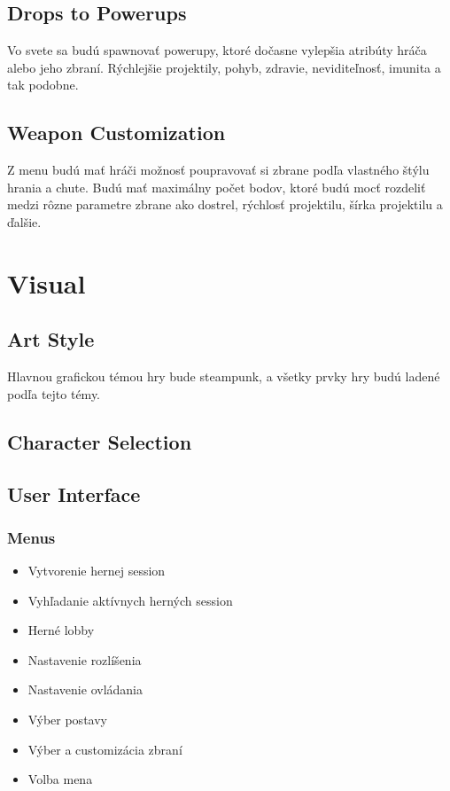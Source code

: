 \documentclass[a4paper]{report}
\begin{document}
\section{Drops to Powerups}
Vo svete sa budú spawnovať powerupy, ktoré dočasne vylepšia atribúty hráča alebo jeho zbraní. Rýchlejšie projektily, pohyb, zdravie, neviditeľnosť, imunita a tak podobne.

\section{Weapon Customization}
Z menu budú mať hráči možnosť poupravovať si zbrane podľa vlastného štýlu hrania a chute. Budú mať maximálny počet bodov, ktoré budú mocť rozdeliť medzi rôzne parametre zbrane ako dostrel, rýchlosť projektilu, šírka projektilu a ďalšie.
 
\chapter{Visual}
\section{Art Style}
Hlavnou grafickou témou hry bude steampunk, a všetky prvky hry budú ladené podľa tejto témy.

\section{Character Selection}
 
\section{User Interface}
\subsection{Menus}
\begin{itemize}
  \item Vytvorenie hernej session
  \item Vyhľadanie aktívnych herných session
  \item Herné lobby
  \item Nastavenie rozlíšenia
  \item Nastavenie ovládania
  \item Výber postavy
  \item Výber a customizácia zbraní
  \item Volba mena
\end{itemize}
 
\end{document}
